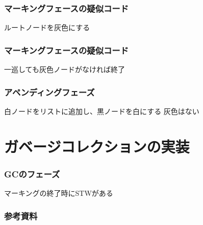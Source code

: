 \documentclass[unicode, 14pt, aspectratio=169]{beamer}
\begin{document}
\begin{frame}
  \frametitle{マーキングフェースの疑似コード}
  {\large ルートノードを灰色にする}
  
\end{frame}
\begin{frame}
  \frametitle{マーキングフェースの疑似コード}
  {\large 一巡しても灰色ノードがなければ終了}
  
\end{frame}
\begin{frame}
  \frametitle{アペンディングフェーズ}
  {\large 白ノードをリストに追加し、黒ノードを白にする}
  灰色はない
\end{frame}
\section{ガベージコレクションの実装}
\begin{frame}
  \frametitle{GCのフェーズ}
  {\large マーキングの終了時にSTWがある}
\end{frame}
\begin{frame}[allowframebreaks,t]
  \frametitle{参考資料}
  \printbibliography
  \nocite{*}
\end{frame}
\end{document}
